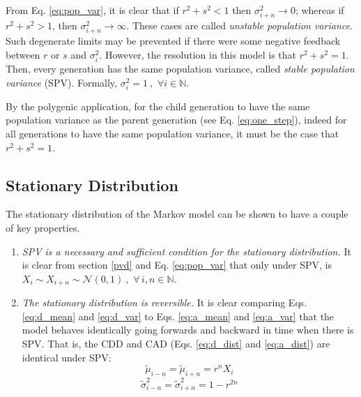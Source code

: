 \documentclass{svproc} %
\begin{document}
From Eq. \ref{eq:pop_var}, it is clear that if $r^2+s^2 < 1$ then $\sigma_{i+n}^2 \rightarrow 0$; whereas if $r^2+s^2 > 1$, then $\sigma_{i+n}^2 \rightarrow \infty$. These cases are called \emph{unstable population variance}. Such degenerate limits may be prevented if there were some negative feedback between $r$ or $s$ and $\sigma_i^2$. However, the resolution in this model is that $r^2+s^2 = 1$. Then, every generation has the same population variance, called \emph{stable population variance} (SPV). Formally, $\sigma_i^2 = 1 \ , \,\, \forall i \in \mathbb{N}$. 

By the polygenic application, for the child generation to have the same population variance as the parent generation (see Eq. \ref{eq:one_step}), indeed for all generations to have the same population variance, it must be the case that  $r^2+s^2 = 1$. 


\subsection{Stationary Distribution}

The stationary distribution of the Markov model can be shown to have a couple of key properties.

\begin{enumerate}
%
\item \emph{SPV is a necessary and sufficient condition for the stationary distribution.} It is clear from section \ref{pvd} and Eq. \ref{eq:pop_var} that only under SPV, is $X_i \sim X_{i+n} \sim \mathcal{N}(0, 1) \ , \,\, \forall \, i, n \in \mathbb{N}$. 

\item \emph{The stationary distribution is reversible.} It is clear comparing Eqs. \ref{eq:d_mean} and \ref{eq:d_var} to Eqs. \ref{eq:a_mean} and \ref{eq:a_var} that the model behaves identically going forwards and backward in time when there is SPV. That is, the CDD and CAD (Eqs. \ref{eq:d_dist} and \ref{eq:a_dist}) are identical under SPV:
\begin{equation}
\tilde{\mu}_{i-n} = \tilde{\mu}_{i+n} = r^nX_i
\label{eq:stable_mean}
%
\end{equation}
\begin{equation}
\tilde{\sigma}_{i-n}^2 = \tilde{\sigma}_{i+n}^2 = 1-r^{2n}
\label{eq:stable_var}
\end{equation}
%
\end{enumerate}
\end{document}
